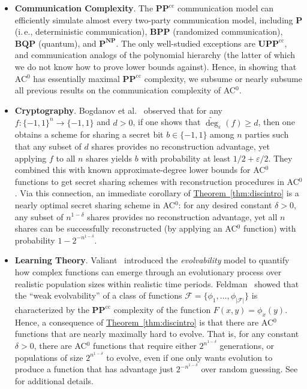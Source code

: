 \documentclass[11pt]{article}
\numberwithin{equation}{section}
\theoremstyle{definition}
\theoremstyle{plain}
\newcommand{\ie}{i.\,e.}
\newcommand{\expref}[2]{\hyperref[#2]{#1~\ref{#2}}}
\newcommand{\bits}{\{-1,1\}}
\newcommand{\PP}{\mathbf{PP}}
\newcommand{\PPcc}{\mathbf{PP}^{\text{cc}}}
\newcommand{\UPPcc}{\mathbf{UPP}^{\text{cc}}}
\newcommand{\eps}{\varepsilon}
\newcommand{\adeg}{\widetilde{\operatorname{deg}}}
\begin{document}
\begin{itemize}
	\item \textbf{Communication Complexity}. 
	The $\PP^{\text{cc}}$ communication model can efficiently simulate 
	almost every two-party communication model, including $\mathbf{P}$ (\ie, deterministic communication), $\mathbf{BPP}$ (randomized communication), $\mathbf{BQP}$ (quantum), and $\mathbf{P}^{\mathbf{NP}}$.
	The only well-studied exceptions are $\UPPcc$, and communication analogs of the polynomial hierarchy (the latter of which we do not know how to prove lower bounds against).
	Hence, in showing that AC$^0$ has essentially maximal $\PP^{\text{cc}}$  complexity, we subsume or nearly subsume 
	all previous results on the communication complexity of AC$^0$.
	\vspace{-1mm}
	\item \textbf{Cryptography}. Bogdanov et al.~\cite{viola} observed that for any
	$f \colon \bits^n \to \bits$ and $d>0$, 
	if one shows that $\adeg_{\eps}(f) \geq d$, then one obtains a scheme
	for sharing a secret bit $b \in \bits$ among $n$ parties
	such that any subset of $d$ shares provides no reconstruction
	advantage, yet applying $f$ to all $n$ shares yields
	$b$ with probability at least $1/2 + \eps/2$.  They combined
	this with known approximate-degree %
	lower bounds for AC$^0$
	functions to get secret sharing schemes with reconstruction procedures in AC$^0$.
	Via this connection, an immediate corollary of \expref{Theorem}{thm:discintro} is a nearly 
	optimal secret sharing scheme in AC$^0$: for any desired constant $\delta > 0$,
	any subset of $n^{1-\delta}$ shares provides no reconstruction
	advantage, yet all $n$ shares can be successfully reconstructed (by applying an AC$^0$ function) with probability
	$1-2^{-n^{1-\delta}}$. 
	\vspace{-1mm}
	\item \textbf{Learning Theory}.
	Valiant~\cite{evolve} introduced the \emph{evolvability} model to quantify how complex functions can emerge through an evolutionary process over realistic population sizes within realistic time
	periods. Feldman~\cite{feldmanevolve} showed that the ``weak evolvability''
	of a class of functions $\mathcal{F} = \{\phi_1, \dots, \phi_{|\mathcal{F}|}\}$
	is characterized by the $\PPcc$ complexity of the function $F(x, y)=\phi_x(y)$. 
	Hence, a consequence of \expref{Theorem}{thm:discintro} 
	is that there are AC$^0$ functions that are nearly maximally
	hard to evolve. That is, for any constant $\delta > 0$,
	there are AC$^0$ functions that require either $2^{n^{1-\delta}}$ generations, or
	populations of size $2^{n^{1-\delta}}$ to evolve,
	even if one only wants evolution to produce a function that has advantage
	just $2^{-n^{1-\delta}}$ over random guessing. 
	See~\cite{feldmanevolve} for additional details.
	

\end{itemize}
\end{document}
